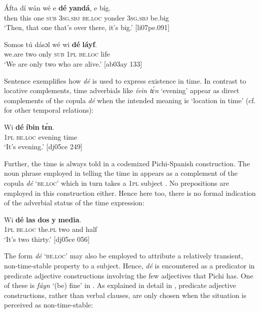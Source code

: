 \ea%
    \label{ex:key:782}
    \gll \'{A}fta    dí  wán  wé  e    \textbf{dé}    \textbf{yandá},  e    bíg.\\
then  this  one  \textsc{sub}  \textsc{3sg.sbj}  \textsc{be.loc}  yonder  \textsc{3sg.sbj}  be.big\\

\glt ‘Then, that one that’s over there, it’s big.’ [li07pe.091]
\z


\ea%
    \label{ex:key:783}
    \gll Somos  tú  dásɔl  wé  wi  \textbf{dé}    \textbf{láyf}.\\
we.are  two  only    \textsc{sub}  \textsc{1pl}  \textsc{be.loc}  life\\

\glt ‘We are only two who are alive.’ [ab03ay 133]
\z

Sentence  exemplifies how \textit{dé} is used to express existence in time. In contrast to locative complements, time adverbials like \textit{ívin tɛ́n} ‘evening’ appear as direct complements of the copula \textit{dé} when the intended meaning is ‘location{\fff} in time’ (cf.  for other temporal relations): 


\ea%
    \label{ex:key:784}
    \gll Wi  \textbf{dé}    \textbf{íbin}    \textbf{tɛ́n}.\\
\textsc{1pl}  \textsc{be.loc}  evening  time\\

\glt ‘It’s evening.’ [dj05ce 249]
\z

Further, the time is always told in a codemixed Pichi-Spanish construction. The noun phrase employed in telling the time in  appears as a complement of the copula \textit{dé} ‘\textsc{be.loc}’ which in turn takes a \textsc{1pl} subject . No prepositions are employed in this construction either. Hence here too, there is no formal indication of the adverbial status of the time expression:


\ea%
    \label{ex:key:785}
    \gll Wi  \textbf{dé}    \textbf{las}    \textbf{dos}  \textbf{y}  \textbf{media}.\\
\textsc{1pl}  \textsc{be.loc}  the\textsc{.pl}  two  and  half\\

\glt ‘It’s two thirty.’ [dj05ce 056]
\z

The form \textit{dé} ‘\textsc{be.loc}’ may also be employed to attribute a relatively transient, non-time-stable property to a subject. Hence, \textit{dé} is encountered as a predicator in predicate adjective constructions involving the few adjectives that Pichi has. One of these is \textit{fáyn} ‘(be) fine’ in . As explained in detail in , predicate adjective constructions, rather than verbal clauses, are only chosen when the situation is perceived as non-time-stable:


